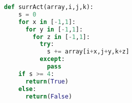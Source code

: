 \begin{lstlisting}[language=Python, caption=\textit{surrAct} Function, label=lst:surrAct]
def surrAct(array,i,j,k):
    s = 0
    for x in [-1,1]:
      for y in [-1,1]:
        for z in [-1,1]:
          try:
            s += array[i+x,j+y,k+z]
          except:
            pass
    if s >= 4:
      return(True)
    else:
      return(False)
\end{lstlisting}